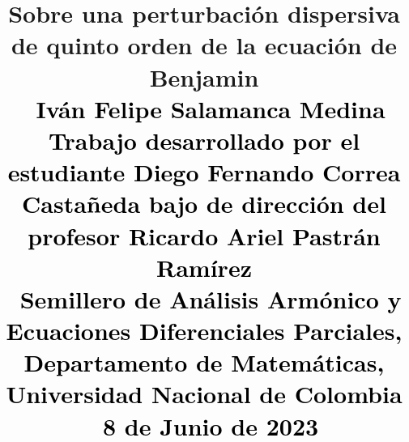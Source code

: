   \skip{}\baselineskip
\def\baselinestretch{1.05}
\parindent0pt

\def\thepage{}

\renewcommand{\footnoterule}{\textcolor{blue}{\rule{0.587\columnwidth}{0.02in}}\vspace*{5mm}}
\title{\color{red}\bfseries {\Huge{Sobre una perturbación dispersiva de quinto orden de la ecuación de Benjamin}}\\\
\normalsize\textcolor{Black}{\huge{Iván Felipe Salamanca Medina}} \\
\textcolor{Black}{\Large{Trabajo desarrollado por el estudiante Diego Fernando Correa Castañeda bajo de dirección del profesor Ricardo Ariel Pastrán Ramírez }} \\\
\normalsize \textcolor{Black}{\Large{Semillero de Análisis Armónico y Ecuaciones Diferenciales Parciales, Departamento de Matemáticas, Universidad Nacional de Colombia}}\\\
\textcolor{Black}{\large{8 de Junio de 2023}}\\\    
}
\author{}
\date{}
\advance
{}
\columnsep=2cm %